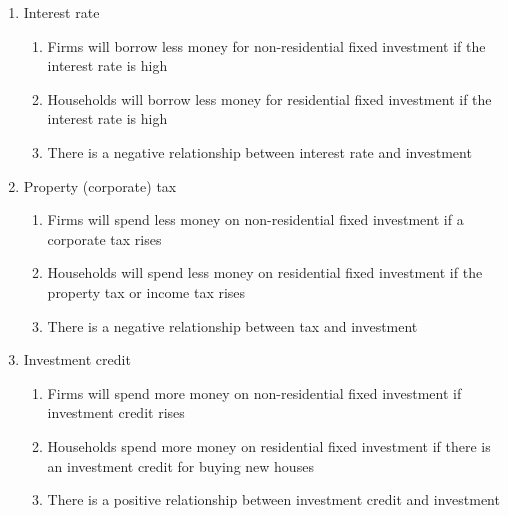 \documentclass[12pt]{article}
\begin{document}
\begin{enumerate}
\begin{enumerate}
\begin{enumerate}
              \item Interest rate

                \begin{enumerate}

                  \item Firms will borrow less money for non-residential fixed investment if the interest rate is high

                  \item Households will borrow less money for residential fixed investment if the interest rate is high

                  \item There is a negative relationship between interest rate and investment

                \end{enumerate}

              \item Property (corporate) tax

                \begin{enumerate}

                  \item Firms will spend less money on non-residential fixed investment if a corporate tax rises

                  \item Households will spend less money on residential fixed investment if the property tax or income tax rises

                  \item There is a negative relationship between tax and investment

                \end{enumerate}

              \item Investment credit

                \begin{enumerate}

                  \item Firms will spend more money on non-residential fixed investment if investment credit rises

                  \item Households spend more money on residential fixed investment if there is an investment credit for buying new houses

                  \item There is a positive relationship between investment credit and investment


\end{enumerate}
\end{enumerate}
\end{enumerate}
\end{enumerate}
\end{document}
